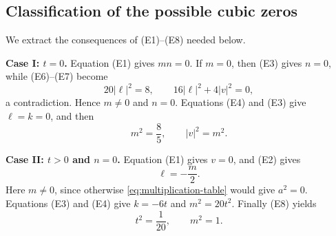 \documentclass[11pt,reqno]{amsart}
\theoremstyle{remark}
\newcommand{\abs}[1]{\left\lvert #1\right\rvert}
\begin{document}
\subsection{Classification of the possible cubic zeros}

We extract the consequences of (E1)--(E8) needed below.

\medskip
\noindent\textbf{Case I: $t=0$.}
Equation (E1) gives $mn=0$.  If $m=0$, then (E3) gives $n=0$, while
(E6)--(E7) become
\[
20\abs\ell^2=8,
\qquad
16\abs\ell^2+4\abs v^2=0,
\]
a contradiction.  Hence $m\ne0$ and $n=0$.  Equations (E4) and (E3) give
$\ell=k=0$, and then
\begin{equation}\label{eq:case-I}
m^2=\frac85,
\qquad
\abs v^2=m^2.
\end{equation}

\medskip
\noindent\textbf{Case II: $t>0$ and $n=0$.}
Equation (E1) gives $v=0$, and (E2) gives
\begin{equation}\label{eq:case-II-ell}
\ell=-\frac m2.
\end{equation}
Here $m\ne0$, since otherwise \eqref{eq:multiplication-table} would give
$a^2=0$.  Equations (E3) and (E4) give
$k=-6t$ and $m^2=20t^2$.  Finally (E8) yields
\begin{equation}\label{eq:case-II}
t^2=\frac1{20},
\qquad
m^2=1.
\end{equation}
\end{document}

